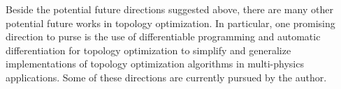 Beside the potential future directions suggested above, there are many other potential future works in topology optimization. In particular, one promising direction to purse is the use of differentiable programming and automatic differentiation for topology optimization to simplify and generalize implementations of topology optimization algorithms in multi-physics applications. Some of these directions are currently pursued by the author.
